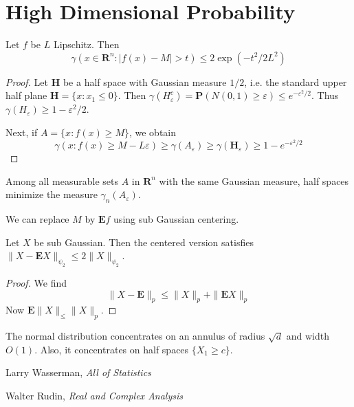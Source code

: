 \chapter{High Dimensional Probability}

\begin{theorem}
    Let $f$ be $L$ Lipschitz. Then
    \[ \gamma(x \in \mathbf{R}^n: |f(x) - M| > t) \leq 2 \exp(-t^2/2L^2) \]
\end{theorem}
\begin{proof}
    Let $\mathbf{H}$ be a half space with Gaussian measure $1/2$, i.e. the standard upper half plane $\mathbf{H} = \{ x: x_1 \leq 0 \}$. Then $\gamma(H_\varepsilon^c) = \mathbf{P}(N(0,1) \geq \varepsilon) \leq e^{-\varepsilon^2/2}$. Thus $\gamma(H_\varepsilon) \geq 1 - \varepsilon^2/2$.

    Next, if $A = \{ x: f(x) \geq M \}$, we obtain
    \[ \gamma(x: f(x) \geq M - L\varepsilon) \geq \gamma(A_\varepsilon) \geq \gamma(\mathbf{H}_\varepsilon) \geq 1 - e^{-\varepsilon^2/2} \]
\end{proof}

\begin{theorem}
    Among all measurable sets $A$ in $\mathbf{R}^n$ with the same Gaussian measure, half spaces minimize the measure $\gamma_n(A_\varepsilon)$.
\end{theorem}

\begin{remark}
    We can replace $M$ by $\mathbf{E}f$ using sub Gaussian centering.
\end{remark}

\begin{theorem}
    Let $X$ be sub Gaussian. Then the centered version satisfies $\| X - \mathbf{E} X \|_{\psi_2} \leq 2 \| X \|_{\psi_2}$.
\end{theorem}
\begin{proof}
    We find
    \[ \| X - \mathbf{E} \|_p \leq \|X \|_p + \| \mathbf{E} X \|_p \]
    Now $\mathbf{E} \|X \|_ \leq \| X \|_p$.
\end{proof}

The normal distribution concentrates on an annulus of radius $\sqrt{d}$ and width $O(1)$. Also, it concentrates on half spaces $\{ X_1 \geq c \}$.



\begin{thebibliography}{10}
     Larry Wasserman,
    \emph{All of Statistics}

     Walter Rudin,
    \emph{Real and Complex Analysis}
\end{thebibliography}













